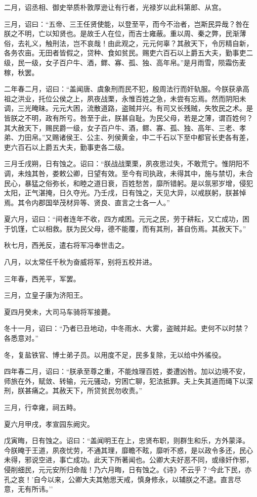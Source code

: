 \documentclass[]{article}
\begin{document}
二月，诏丞相、御史举质朴敦厚逊让有行者，光禄岁以此科第郎、从宫。

三月，诏曰：``五帝、三王任贤使能，以登至平，而今不治者，岂斯民异哉？咎在朕之不明，亡以知贤也。是故壬人在位，而吉士雍蔽。重以周、秦之弊，民渐薄俗，去礼义，触刑法，岂不哀哉！由此观之，元元何辜？其赦天下，令厉精自新，各务农亩。无田者皆假之，贷种、食如贫民。赐吏六百石以上爵五大夫，勤事吏二级，民一级，女子百户牛、酒，鳏、寡、孤、独、高年帛。''是月雨雪，陨霜伤麦稼，秋罢。

二年春二月，诏曰：``盖闻唐、虞象刑而民不犯，殷周法行而奸轨服。今朕获承高祖之洪业，托位公侯之上，夙夜战栗，永惟百姓之急，未尝有忘焉。然而阴阳未调，三光晻昧。元元大困，流散道路，盗贼并兴。有司又长残贼，失牧民之术。是皆朕之不明，政有所亏。咎至于此，朕甚自耻。为民父母，若是之薄，谓百姓何？其大赦天下，赐民爵一级，女子百户牛、酒，鳏、寡、孤、独、高年、三老、孝弟、力田帛。''又赐诸侯王、公主、列侯黄金，中二千石以下至中都官长吏各有差，吏六百石以上爵五大夫，勤事吏各二级。

三月壬戌朔，日有蚀之。诏曰：``朕战战栗栗，夙夜思过失，不敢荒宁。惟阴阳不调，未烛其咎，娄敕公卿，日望有效。至今有司执政，未得其中，施与禁切，未合民心，暴猛之俗弥长，和睦之道日衰，百姓愁苦，靡所错躬。是以氛邪岁增，侵犯太阳，正气湛掩，日久夺光。乃壬戌，日有蚀之，天见大异，以戒朕躬，朕甚悼焉。其令内郡国举茂材异等、贤良、直言之士各一人。''

夏六月，诏曰：``间者连年不收，四方咸困。元元之民，劳于耕耘，又亡成功，困于饥馑，亡以相救。朕为民父母，德不能覆，而有其刑，甚自伤焉。其赦天下。''

秋七月，西羌反，遣右将军冯奉世击之。

八月，以太常任千秋为奋威将军，别将五校并进。

三年春，西羌平，军罢。

三月，立皇子康为济阳王。

夏四月癸未，大司马车骑将军接薨。

冬十一月，诏曰：``乃者已丑地动，中冬雨水、大雾，盗贼并起。吏何不以时禁？各悉意对。''

冬，复盐铁官、博士弟子员。以用度不足，民多复除，无以给中外徭役。

四年春二月，诏曰：``朕承至尊之重，不能烛理百姓，娄遭凶咎。加以边境不安，师旅在外，赋敛、转输，元元骚动，穷困亡聊，犯法抵罪。夫上失其道而绳下以深刑，朕甚痛之。其赦天下，所贷贫民勿收责。''

三月，行幸雍，祠五畤。

夏六月甲戌，孝宣园东阙灾。

戊寅晦，日有蚀之。诏曰：``盖闻明王在上，忠贤布职，则群生和乐，方外蒙泽。今朕晻于王道，夙夜忧劳，不通其理，靡瞻不眩，靡听不惑，是以政令多还，民心未得，邪说空进，事亡成功。此天下所著闻也。公卿大夫好恶不同，或缘奸作邪，侵削细民，元元安所归命哉！乃六月晦，日有蚀之。《诗》不云乎？`今此下民，亦孔之哀！'自今以来，公卿大夫其勉思天戒，慎身修永，以辅朕之不逮。直言尽意，无有所讳。''
\end{document}
